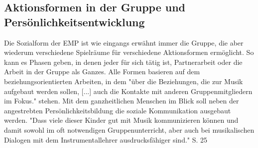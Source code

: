 \subsection{Aktionsformen in der Gruppe und Persönlichkeitsentwicklung}
Die Sozialform der EMP ist wie eingangs erwähnt immer die Gruppe, die aber
wiederum verschiedene Spielräume für verschiedene Aktionsformen ermöglicht. So
kann es Phasen geben, in denen jeder für sich tätig ist, Partnerarbeit oder die
Arbeit in der Gruppe als Ganzes. Alle Formen basieren auf dem beziehungsorientierten
Arbeiten, in dem "über die Beziehungen, die zur Musik aufgebaut werden sollen,
[...] auch die Kontakte mit anderen Gruppenmitgliedern im Fokus."
\autocite[10]{dartsch:kern_des_musizierens} stehen. Mit dem ganzheitlichen Menschen im
Blick soll neben der angestrebten Persönlichkeitsbildung die soziale
Kommunikation ausgebaut werden.
"Dass viele dieser Kinder gut mit Musik kommunizieren können und damit sowohl im
oft notwendigen Gruppenunterricht, aber auch bei musikalischen Dialogen mit dem
Instrumentallehrer ausdrucksfähiger sind." S. 25%












